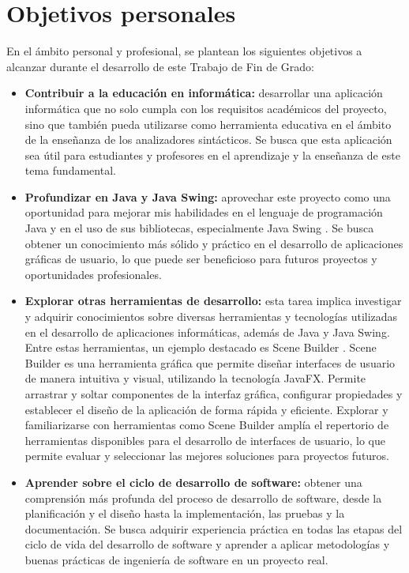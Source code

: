 \section{Objetivos personales}

En el ámbito personal y profesional, se plantean los siguientes objetivos a alcanzar durante el desarrollo de este Trabajo de Fin de Grado:

\begin{itemize}
    \item \textbf{Contribuir a la educación en informática:} desarrollar una aplicación informática que no solo cumpla con los requisitos académicos del proyecto, sino que también pueda utilizarse como herramienta educativa en el ámbito de la enseñanza de los analizadores sintácticos. Se busca que esta aplicación sea útil para estudiantes y profesores en el aprendizaje y la enseñanza de este tema fundamental.
    
    \item \textbf{Profundizar en Java y Java Swing:} aprovechar este proyecto como una oportunidad para mejorar mis habilidades en el lenguaje de programación Java y en el uso de sus bibliotecas, especialmente Java Swing \cite{javaswing}. Se busca obtener un conocimiento más sólido y práctico en el desarrollo de aplicaciones gráficas de usuario, lo que puede ser beneficioso para futuros proyectos y oportunidades profesionales.

    \item \textbf{Explorar otras herramientas de desarrollo:} esta tarea implica investigar y adquirir conocimientos sobre diversas herramientas y tecnologías utilizadas en el desarrollo de aplicaciones informáticas, además de Java y Java Swing. Entre estas herramientas, un ejemplo destacado es Scene Builder \cite{scenebuilder}. Scene Builder es una herramienta gráfica que permite diseñar interfaces de usuario de manera intuitiva y visual, utilizando la tecnología JavaFX. Permite arrastrar y soltar componentes de la interfaz gráfica, configurar propiedades y establecer el diseño de la aplicación de forma rápida y eficiente. Explorar y familiarizarse con herramientas como Scene Builder amplía el repertorio de herramientas disponibles para el desarrollo de interfaces de usuario, lo que permite evaluar y seleccionar las mejores soluciones para proyectos futuros.
    
    \item \textbf{Aprender sobre el ciclo de desarrollo de software:} obtener una comprensión más profunda del proceso de desarrollo de software, desde la planificación y el diseño hasta la implementación, las pruebas y la documentación. Se busca adquirir experiencia práctica en todas las etapas del ciclo de vida del desarrollo de software y aprender a aplicar metodologías y buenas prácticas de ingeniería de software en un proyecto real.
\end{itemize}